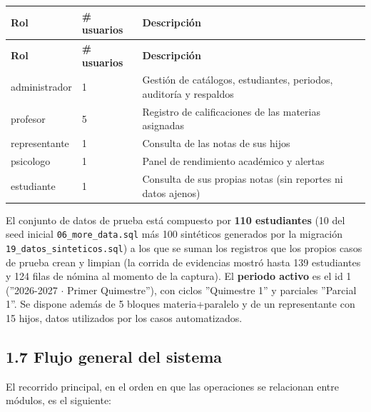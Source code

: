 \documentclass[11pt,a4paper]{article}
\begin{document}
{\small
\begin{longtable}{|p{}|p{}|p{}|}
\rowcolor{UTECblue}\color{white}\bfseries Rol & \color{white}\bfseries \# usuarios & \color{white}\bfseries Descripción \\ \hline
\endfirsthead
\rowcolor{UTECblue}\color{white}\bfseries Rol & \color{white}\bfseries \# usuarios & \color{white}\bfseries Descripción \\ \hline
\endhead
administrador & 1 & Gestión de catálogos, estudiantes, periodos, auditoría y respaldos \\ \hline
profesor & 5 & Registro de calificaciones de las materias asignadas \\ \hline
representante & 1 & Consulta de las notas de sus hijos \\ \hline
psicologo & 1 & Panel de rendimiento académico y alertas \\ \hline
estudiante & 1 & Consulta de sus propias notas (sin reportes ni datos ajenos) \\ \hline
\end{longtable}}


El conjunto de datos de prueba está compuesto por \textbf{110 estudiantes} (10 del seed inicial \texttt{06\_more\_data.sql} más 100 sintéticos generados por la migración \texttt{19\_datos\_sinteticos.sql}) a los que se suman los registros que los propios casos de prueba crean y limpian (la corrida de evidencias mostró hasta 139 estudiantes y 124 filas de nómina al momento de la captura). El \textbf{periodo activo} es el id 1 (''2026-2027 {$\cdot$} Primer Quimestre''), con ciclos ''Quimestre 1'' y parciales ''Parcial 1''. Se dispone además de 5 bloques materia+paralelo y de un representante con 15 hijos, datos utilizados por los casos automatizados.


\subsection*{1.7 Flujo general del sistema}


El recorrido principal, en el orden en que las operaciones se relacionan entre módulos, es el siguiente:
\end{document}
